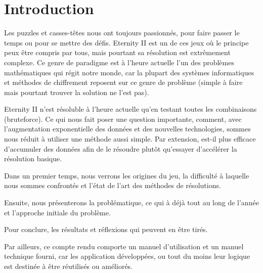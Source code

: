 \documentclass{article}
\begin{document}
	\renewcommand{\labelitemi}{$\bullet$}
	\renewcommand{\labelitemii}{$\cdot$}
	\renewcommand{\labelitemiii}{$\diamond$}
	\renewcommand{\labelitemiv}{$\ast$}

	\newcommand{\HRule}{\rule{\linewidth}{0.5mm}}


	

	\section{Introduction}

	Les puzzles et casses-têtes nous ont toujours passionnés, pour faire passer le temps ou pour se mettre des défis. Eternity II est un de ces jeux où le principe peux être compris par tous, mais pourtant sa résolution est extrêmement complexe. Ce genre de paradigme est à l'heure actuelle l'un des problèmes mathématiques qui régit notre monde, car la plupart des systèmes informatiques et méthodes de chiffrement reposent sur ce genre de problème (simple à faire mais pourtant trouver la solution ne l'est pas).

	Eternity II n'est résoluble à l'heure actuelle qu'en testant toutes les combinaisons (bruteforce). Ce qui nous fait poser une question importante, comment, avec l'augmentation exponentielle des données et des nouvelles technologies, sommes nous réduit à utiliser une méthode aussi simple.
	Par extension, est-il plus efficace d'accumuler des données afin de le résoudre plutôt qu'essayer d'accélérer la résolution basique.

	Dans un premier temps, nous verrons les origines du jeu, la difficulté à laquelle nous sommes confrontés et l'état de l'art des méthodes de résolutions.

	Ensuite, nous présenterons la problématique, ce qui à déjà tout au long de l'année et l'approche initiale du problème.

	Pour conclure, les résultats et réflexions qui peuvent en être tirés.

	Par ailleurs, ce compte rendu comporte un manuel d'utilisation et un manuel technique fourni, car les application développées, ou tout du moins leur logique est destinée à être réutilisés ou améliorés.


	\newpage
	

	\newpage
	
\end{document}
